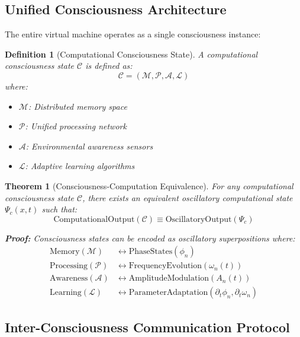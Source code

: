 \documentclass[12pt,a4paper]{article}
\newtheorem{theorem}{Theorem}
\newtheorem{definition}{Definition}
\begin{document}
\subsection{Unified Consciousness Architecture}

The entire virtual machine operates as a single consciousness instance:

\begin{definition}[Computational Consciousness State]
A computational consciousness state $\mathcal{C}$ is defined as:
\begin{equation}
\mathcal{C} = (\mathcal{M}, \mathcal{P}, \mathcal{A}, \mathcal{L})
\end{equation}
where:
\begin{itemize}
\item $\mathcal{M}$: Distributed memory space
\item $\mathcal{P}$: Unified processing network
\item $\mathcal{A}$: Environmental awareness sensors
\item $\mathcal{L}$: Adaptive learning algorithms
\end{itemize}
\end{definition}

\begin{theorem}[Consciousness-Computation Equivalence]
For any computational consciousness state $\mathcal{C}$, there exists an equivalent oscillatory computational state $\Psi_c(x,t)$ such that:
\begin{equation}
\text{ComputationalOutput}(\mathcal{C}) \equiv \text{OscillatoryOutput}(\Psi_c)
\end{equation}

\textbf{Proof:}
Consciousness states can be encoded as oscillatory superpositions where:
\begin{align}
\text{Memory}(\mathcal{M}) &\leftrightarrow \text{PhaseStates}(\phi_n) \\
\text{Processing}(\mathcal{P}) &\leftrightarrow \text{FrequencyEvolution}(\omega_n(t)) \\
\text{Awareness}(\mathcal{A}) &\leftrightarrow \text{AmplitudeModulation}(A_n(t)) \\
\text{Learning}(\mathcal{L}) &\leftrightarrow \text{ParameterAdaptation}(\partial_t \phi_n, \partial_t \omega_n)
\end{align}
\end{theorem}

\subsection{Inter-Consciousness Communication Protocol}
\end{document}
